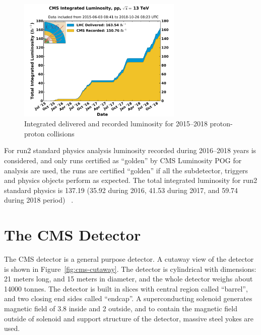 \begin{figure}[!ht]
  \centering
  \includegraphics[width=0.70\textwidth]{figures/int_lumi_pp_run2.pdf}
  \caption[Integrated delivered and recorded luminosity
    for 2015--2018 proton-proton collisions]%
  {Integrated delivered and recorded luminosity
    for  2015--2018 proton-proton collisions~\cite{plot-cms-lumi}}%
  \label{fig:int-lumi}
\end{figure}

For run2 standard physics analysis luminosity recorded during
2016--2018 years is considered, and only runs certified as ``golden'' by \gls{CMS}
Luminosity \gls{POG} for analysis are used, the runs
are certified ``golden'' if all the subdetector, triggers and
physics objects perform as expected. The total
integrated luminosity for run2
standard physics is 137.19\fbinv{} (35.92\fbinv{} during 2016, 41.53\fbinv{}
during 2017, and 59.74\fbinv{} during 2018 period)
~\cite{CMS-PAS-LUM-17-001,CMS-PAS-LUM-17-004,CMS-PAS-LUM-18-002}.

\section{
  The CMS Detector
 }\label{ch_cms:cms}

The \gls{CMS} detector is a general purpose detector.
A cutaway view of the detector is shown in Figure~\ref{fig:cms-cutaway}.
The detector is cylindrical with dimensions: 21 meters long, and 15 meters
in diameter, and the whole detector weighs about 14000 tonnes.
The detector is built in slices with central region called ``barrel'',
and two closing end sides called ``endcap''.
A superconducting solenoid generates magnetic field of 3.8\Tesla{} inside
and 2\Tesla{} outside, and to contain the magnetic field outside of solenoid
and support structure of the detector, massive steel yokes are used.

